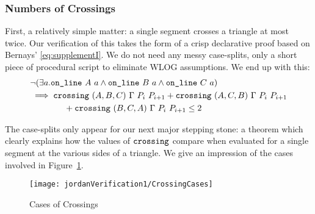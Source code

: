 \subsubsection{Numbers of Crossings}
First, a relatively simple matter: a single segment crosses a triangle at most twice. Our verification of this takes the form of a crisp declarative proof based on Bernays' \ref{eq:supplementI}. We do not need any messy case-splits, only a short piece of procedural script to eliminate WLOG assumptions. We end up with this:
\begin{equation}
  \begin{split}
    &\neg(\exists a.\texttt{on\_line}\ A\ a\wedge \texttt{on\_line}\ B\ a\wedge \texttt{on\_line}\ C\ a)\\
    &\implies \texttt{crossing}\ (A,B,C)\ \Gamma\ P_i\ P_{i+1} + \texttt{crossing}\ (A,C,B)\ \Gamma\ P_i\ P_{i+1}\\
    &\qquad\qquad+ \texttt{crossing}\ (B,C,A)\ \Gamma\ P_i\ P_{i+1} \leq 2
  \end{split}
\end{equation}

The case-splits only appear for our next major stepping stone: a theorem which clearly explains how the values of $\texttt{crossing}$ compare when evaluated for a single segment at the various sides of a triangle. We give an impression of the cases involved in Figure~\ref{fig:CrossingCases}.

\begin{figure}
\centering\texttt{[image: jordanVerification1/CrossingCases]}
\caption{Cases of Crossings}
\label{fig:CrossingCases}
\end{figure}

